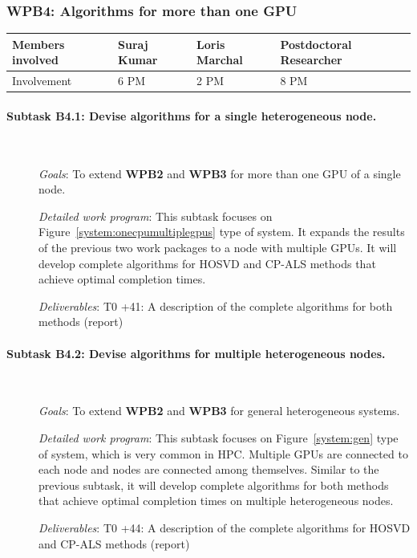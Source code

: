 \documentclass[a4paper,11pt]{article}
\newcommand{\subtask}[1]{{\color{orange}\paragraph{#1}$ $}}
\newcommand{\goal}{{\color{orange2}  \emph{Goals}:} }
\newcommand{\dwp}{{\color{orange2}  \emph{Detailed work program}: }}
\newcommand{\deliverables}{{\color{orange2}  \emph{Deliverables}: }}
\begin{document}
	\subsubsection{\textbf{WPB4}: Algorithms for more than one GPU}
	\begin{table}[H]
		\begin{tabular}{llll}
			\hline
			\cellcolor{blue2}
			Members involved & Suraj Kumar& Loris Marchal & Postdoctoral Researcher \\
			\hline
			\cellcolor{orange2}
			Involvement      & 6 PM            & 2 PM & 8 PM \\
			\hline
		\end{tabular}
	\end{table}
	\subtask{Subtask B4.1: Devise algorithms for a single heterogeneous node.}
	\begin{description}
		\item[] \goal To extend \textbf{WPB2} and \textbf{WPB3} for more than one GPU of a single node.
		\item[] \dwp This subtask focuses on Figure~\ref{system:onecpumultiplegpus} type of system. It expands the results of the previous two work packages to a node with multiple GPUs. It will develop complete algorithms for HOSVD and CP-ALS methods that achieve optimal completion times.
		\item[] \deliverables\newline
		T0 +41: A description of the complete algorithms for both methods (report)
	\end{description}
	\subtask{Subtask B4.2: Devise algorithms for multiple heterogeneous nodes.}
	\begin{description}
		\item[] \goal To extend \textbf{WPB2} and \textbf{WPB3} for general heterogeneous systems.
		\item[] \dwp This subtask focuses on Figure~\ref{system:gen} type of system, which is very common in HPC. Multiple GPUs are connected to each node and nodes are connected among themselves. Similar to the previous subtask, it will develop complete algorithms for both methods that achieve optimal completion times on multiple heterogeneous nodes.
		\item[] \deliverables\newline
		T0 +44: A description of the complete algorithms for HOSVD and CP-ALS methods (report) 
	\end{description}
	

	
	
	
\end{document}
